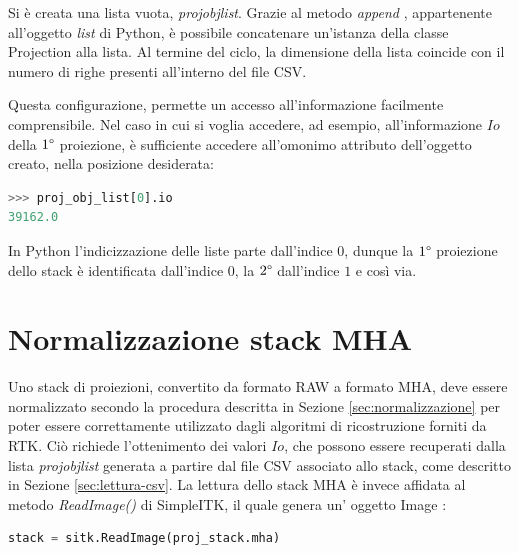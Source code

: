 \documentclass[a4paper,12pt, doubleside]{report}
\begin{document}
                Si è creata una lista vuota, \textit{proj\textunderscore obj\textunderscore list}. Grazie al metodo \textit{append} \cite{python-append}, appartenente all'oggetto \textit{list} di Python, è possibile concatenare un'istanza della classe Projection alla lista. Al termine del ciclo, la dimensione della lista coincide con il numero di righe presenti all'interno del file CSV.
            
            \bigskip
            \par
                Questa configurazione, permette un accesso all'informazione facilmente comprensibile. Nel caso in cui si voglia accedere, ad esempio, all'informazione $Io$ della $1\degree$ proiezione, è sufficiente accedere all'omonimo attributo dell'oggetto creato, nella posizione desiderata: 
            
                \begin{lstlisting}[language=python, frame=bt]
>>> proj_obj_list[0].io
39162.0
                \end{lstlisting}
            
               In Python l'indicizzazione delle liste parte dall'indice $0$, dunque la $1\degree$ proiezione dello stack è identificata dall'indice $0$, la $2\degree$ dall'indice $1$ e così via.
        
        \section{Normalizzazione stack MHA}
            \label{sec:norm-disp}
            
            \par
                Uno stack di proiezioni, convertito da formato RAW a formato MHA, deve essere normalizzato secondo la procedura descritta in Sezione \ref{sec:normalizzazione} per poter essere correttamente utilizzato dagli algoritmi di ricostruzione forniti da RTK. Ciò richiede l'ottenimento dei valori $Io$, che possono essere recuperati dalla lista \textit{proj\textunderscore obj\textunderscore list} generata a partire dal file CSV associato allo stack, come descritto in Sezione \ref{sec:lettura-csv}. La lettura dello stack MHA è invece affidata al metodo \textit{ReadImage()} di SimpleITK, il quale genera un' oggetto Image \cite{sitk-image}:
                
                \begin{lstlisting}[language=python, frame=bt]
stack = sitk.ReadImage(proj_stack.mha)
                \end{lstlisting}
                
\end{document}
